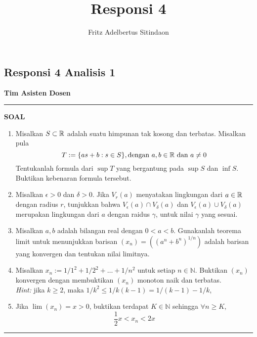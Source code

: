 \documentclass{article}
\title{Responsi 4}
\author{Fritz Adelbertus Sitindaon}
\date{}
\begin{document}
\begin{flushright}
    \section*{Responsi 4 Analisis 1}
    \textbf{Tim Asisten Dosen}
\end{flushright}


\vspace{0.5cm}\hrule height 2pt\vspace{0.5cm}



\begin{center}
\textbf{\large{SOAL}}
\end{center}
\begin{enumerate}[leftmargin=*, label={\arabic*}.]
\item Misalkan $S \subset \mathbb{R}$ adalah suatu himpunan tak kosong dan terbatas. Misalkan pula
\[
    T := \{as+b: s\in S\}, \text{dengan } a,b\in \mathbb{R} \text{ dan } a\neq 0
\]
Tentukanlah formula dari $\sup T$ yang bergantung pada $\sup S$ dan $\inf S$. Buktikan kebenaran formula tersebut.

\item Misalkan $\epsilon > 0$ dan $\delta > 0$. Jika $V_r(a)$ menyatakan lingkungan 
dari $a \in \mathbb{R}$ dengan radius $r$, tunjukkan bahwa $V_\epsilon(a)\cap V_\delta(a)$ 
dan $V_\epsilon(a) \cup V_\delta(a)$ merupakan lingkungan dari $a$ dengan raidus 
$\gamma$, untuk nilai $\gamma$ yang sesuai.

\item Misalkan $a,b$ adalah bilangan real dengan $0 < a < b$. Gunakanlah teorema limit 
untuk menunjukkan barisan $(x_n)=((a^n+b^n)^{1/n})$ adalah barisan yang konvergen 
dan tentukan nilai limitnya.

\item Misalkan $x_n := 1/1^2+1/2^2+\dots+1/n^2$ untuk setiap $n \in \mathbb{N}$. Buktikan $(x_n)$ konvergen dengan
membuktikan $(x_n)$ monoton naik dan terbatas. \\\textit{Hint:} jika $k \geq 2$, maka $1/k^2\leq 1/k(k-1)=1/(k-1)-1/k$,

\item Jika $\lim(x_n)=x > 0$, buktikan terdapat $K \in \mathbb{N}$ sehingga $\forall n \geq K$,
\[
    \frac{1}{2}x < x_n < 2x
\]
\end{enumerate}


\vspace{0.2cm}\hrule height 1pt
\end{document}
